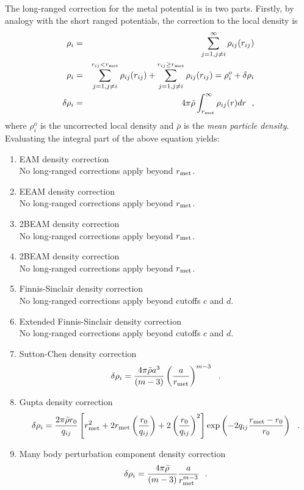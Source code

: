 The long-ranged correction
for the \D metal potential is in two parts.  Firstly, by analogy
with the short ranged potentials, the correction to the
local density is
\begin{eqnarray}
\rho_{i} &=& \sum_{j=1, j \ne i}^{\infty} \rho_{ij}(r_{ij}) \nonumber \\
\rho_{i} &=& \sum_{j=1, j \ne i}^{r_{ij}<r_{\rm met}} \rho_{ij}(r_{ij}) +
\sum_{j=1, j \ne i}^{r_{ij} \ge r_{\rm met}} \rho_{ij}(r_{ij}) =
\rho_{i}^{o} + \delta \rho_{i} \\
\delta \rho_{i} &=& 4 \pi \bar{\rho} \int_{r_{\rm met}}^{\infty} \rho_{ij}(r) dr~~, \nonumber
\end{eqnarray}
where $\rho_{i}^{o}$ is the uncorrected local density and
$\bar{\rho}$ is the {\em mean particle density}.  Evaluating the
integral part of the above equation yields:
\begin{enumerate}
\item EAM density correction \\
No long-ranged corrections apply beyond $r_{\rm met}$.
\item EEAM density correction \\
No long-ranged corrections apply beyond $r_{\rm met}$.
\item 2BEAM density correction \\
No long-ranged corrections apply beyond $r_{\rm met}$.
\item 2BEAM density correction \\
No long-ranged corrections apply beyond $r_{\rm met}$.
\item Finnis-Sinclair density correction \\
No long-ranged corrections apply beyond cutoffs $c$ and $d$.
\item Extended Finnis-Sinclair density correction \\
No long-ranged corrections apply beyond cutoffs $c$ and $d$.
\item Sutton-Chen density correction
\begin{eqnarray}
\delta \rho_{i} = \frac{4 \pi \bar{\rho} a^{3}}{(m-3)}
\left( \frac{a}{r_{\rm met}} \right)^{m-3}~~.
\end{eqnarray}
\item Gupta density correction
\begin{eqnarray}
\delta \rho_{i} = \frac{2 \pi \bar{\rho} r_{0}}{q_{ij}}
\left[ r_{\rm met}^{2} + 2 r_{\rm met} \left(\frac{r_{0}}{q_{ij}}\right) +
2 \left(\frac{r_{0}}{q_{ij}}\right)^{2} \right]
\exp \left( -2 q_{ij} \frac{r_{\rm met}-r_{0}}{r_{0}}\right)~~.
\end{eqnarray}
\item Many body perturbation component density correction
\begin{eqnarray}
\delta \rho_{i} = \frac{4 \pi \bar{\rho}}{(m-3)}
\frac{a}{r_{\rm met}^{m-3}}~~.
\end{eqnarray}
\end{enumerate}
